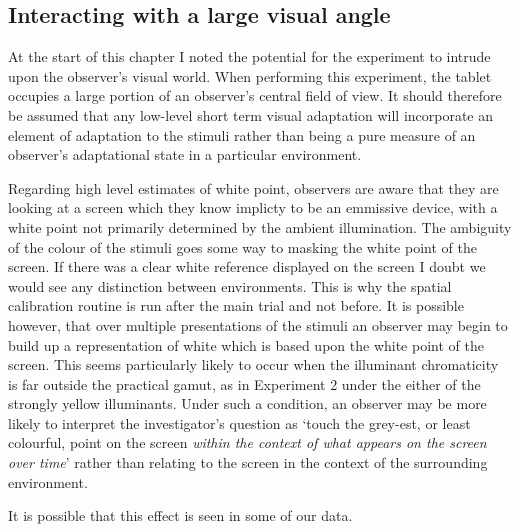 \subsection{Interacting with a large visual angle}

At the start of this chapter I noted the potential for the experiment to intrude upon the observer's visual world. When performing this experiment, the tablet occupies a large portion of an observer's central field of view. It should therefore be assumed that any low-level short term visual adaptation will incorporate an element of adaptation to the stimuli rather than being a pure measure of an observer's adaptational state in a particular environment. 

Regarding high level estimates of white point, observers are aware that they are looking at a screen which they know implicty to be an emmissive device, with a white point not primarily determined by the ambient illumination. The ambiguity of the colour of the stimuli goes some way to masking the white point of the screen. If there was a clear white reference displayed on the screen I doubt we would see any distinction between environments. This is why the spatial calibration routine is run after the main trial and not before. It is possible however, that over multiple presentations of the stimuli an observer may begin to build up a representation of white which is based upon the white point of the screen. This seems particularly likely to occur when the illuminant chromaticity is far outside the practical gamut, as in Experiment 2 under the either of the strongly yellow illuminants. Under such a condition, an observer may be more likely to interpret the investigator's question as `touch the grey-est, or least colourful, point on the screen \emph{within the context of what appears on the screen over time}' rather than relating to the screen in the context of the surrounding environment.

It is possible that this effect is seen in some of our data. %


